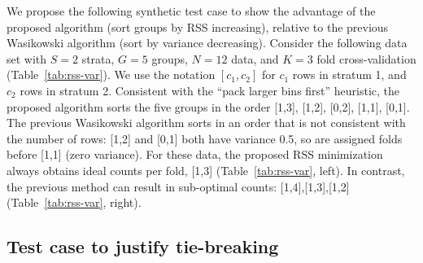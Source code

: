 \documentclass[twoside]{article}
\begin{document}



We propose the following synthetic test case to show the advantage of the proposed algorithm (sort groups by RSS increasing), relative to the previous Wasikowski algorithm (sort by variance decreasing).
Consider the following data set with $S=2$ strata, $G=5$ groups, $N=12$ data, and $K=3$ fold cross-validation (Table~\ref{tab:rss-var}).
We use the notation $[c_1,c_2]$ for $c_1$ rows in stratum 1, and $c_2$ rows in stratum 2.
Consistent with the ``pack larger bins first'' heuristic, the proposed algorithm sorts the five groups in the order [1,3], [1,2], [0,2], [1,1], [0,1].
The previous Wasikowski algorithm sorts in an order that is not consistent with the number of rows: [1,2] and [0,1] both have variance 0.5, so are assigned folds before [1,1] (zero variance).
For these data, the proposed RSS minimization always obtains ideal counts per fold, [1,3] (Table~\ref{tab:rss-var}, left).
In contrast, the previous method can result in sub-optimal counts: [1,4],[1,3],[1,2] (Table~\ref{tab:rss-var}, right).

\subsection{Test case to justify tie-breaking}
\end{document}
